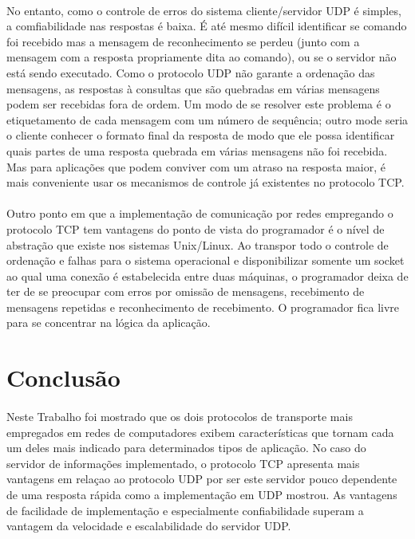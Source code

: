 \documentclass[a4paper,10pt,oneside,final,titlepage,onecolumn]{scrartcl}
\begin{document}
\paragraph{}No entanto, como o controle de erros do sistema cliente/servidor UDP é simples, a comfiabilidade nas respostas é baixa. É até mesmo difícil identificar se comando foi recebido mas a mensagem de reconhecimento se perdeu (junto com a mensagem com a resposta propriamente dita ao comando), ou se o servidor não está sendo executado. Como o protocolo UDP não garante a ordenação das mensagens, as respostas à consultas que são quebradas em várias mensagens podem ser recebidas fora de ordem. Um modo de se resolver este problema é o etiquetamento de cada mensagem com um número de sequência; outro mode seria o cliente conhecer o formato final da resposta de modo que ele possa identificar quais partes de uma resposta quebrada em várias mensagens não foi recebida. Mas para aplicações que podem conviver com um atraso na resposta maior, é mais conveniente usar os mecanismos de controle já existentes no protocolo TCP.
\paragraph{}Outro ponto em que a implementação de comunicação por redes empregando o protocolo TCP tem vantagens do ponto de vista do programador é o nível de abstração que existe nos sistemas Unix/Linux. Ao transpor todo o controle de ordenação e falhas para o sistema operacional e disponibilizar somente um socket ao qual uma conexão é estabelecida entre duas máquinas, o programador deixa de ter de se preocupar com erros por omissão de mensagens, recebimento de mensagens repetidas e reconhecimento de recebimento. O programador fica livre para se concentrar na lógica da aplicação.



\FloatBarrier

\section{Conclusão}
\paragraph{}Neste Trabalho foi mostrado que os dois protocolos de transporte mais empregados em redes de computadores exibem características que tornam cada um deles mais indicado para determinados tipos de aplicação. No caso do servidor de informações implementado, o protocolo TCP apresenta mais vantagens em relaçao ao protocolo UDP por ser este servidor pouco dependente de uma
resposta rápida como a implementação em UDP mostrou. As vantagens de facilidade de implementação e especialmente confiabilidade superam a vantagem da velocidade e escalabilidade do servidor UDP.
\end{document}
